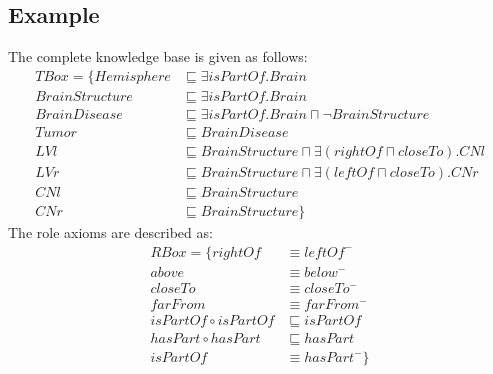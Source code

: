 \documentclass{article}
\begin{document}
\subsection{Example}
 The complete knowledge base is given as follows:
\begin{align*}
 TBox=\{ Hemisphere &\sqsubseteq \exists isPartOf. Brain\\
	 BrainStructure &\sqsubseteq \exists isPartOf. Brain\\
	 BrainDisease &\sqsubseteq \exists isPartOf. Brain \sqcap \neg BrainStructure\\
	 Tumor  &\sqsubseteq BrainDisease\\
	 LVl &\sqsubseteq BrainStructure \sqcap \exists (rightOf \sqcap closeTo). CNl\\
	 LVr &\sqsubseteq BrainStructure \sqcap \exists (leftOf \sqcap closeTo). CNr\\
	 CNl &\sqsubseteq BrainStructure\\
	 CNr &\sqsubseteq BrainStructure\}
\end{align*}
The role axioms are described as:
\begin{align*}
 RBox=\{ rightOf &\equiv leftOf^-\\
         above &\equiv below^- \\
	 closeTo &\equiv closeTo^- \\
	 farFrom &\equiv farFrom^- \\
	 isPartOf \circ isPartOf &\sqsubseteq isPartOf \\
	 hasPart \circ hasPart &\sqsubseteq hasPart\\
	 isPartOf &\equiv hasPart^-\}
\end{align*}
\end{document}
